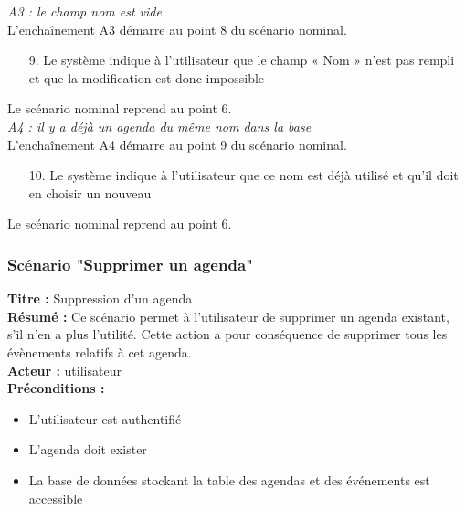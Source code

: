 \documentclass[12pt , a4paper]{article}
\begin{document}
\noindent\textit{A3 : le champ nom est vide}\\
L'encha\^inement A3 démarre au point 8 du scénario nominal.
\begin{enumerate}
\item[9.] Le système indique à l’utilisateur que le champ « Nom » n’est pas rempli et que la modification est donc impossible
\end{enumerate}
Le scénario nominal reprend au point 6.\\


\noindent\textit{A4 : il y a déjà un agenda du même nom dans la base}\\
L'encha\^inement A4 démarre au point 9 du scénario nominal.
\begin{enumerate}
\item[10.] Le système indique à l’utilisateur que ce nom est déjà utilisé et qu’il doit en choisir un nouveau
\end{enumerate}
Le scénario nominal reprend au point 6.\\

\newpage
\subsubsection{Scénario "Supprimer un agenda"}
\noindent\textbf{Titre : } Suppression d’un agenda\\
\textbf{Résumé : } Ce scénario permet à l’utilisateur de supprimer un agenda existant, s’il n’en a plus l’utilité. Cette action a pour conséquence de supprimer tous les évènements relatifs à cet agenda.\\
\textbf{Acteur : }utilisateur\\

\noindent\textbf{Préconditions :}
\begin{itemize}
\item L’utilisateur est authentifié
\item L'agenda doit exister
\item La base de données stockant la table des agendas et des événements est accessible\\
\end{itemize}
\end{document}
